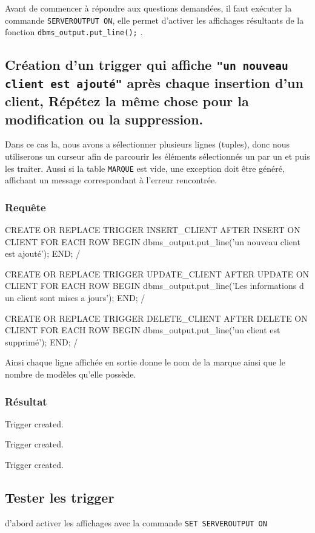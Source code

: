 \documentclass[•]{article}
\begin{document}
\def\reportnumber{5}
\def\reporttitle{TRIGGERS}



Avant de commencer à répondre aux questions demandées, il faut exécuter la commande \texttt{SERVEROUTPUT ON}, elle permet d'activer les affichages résultants de la fonction \texttt{dbms\_output.put\_line();} .

\subsection{Création d'un trigger qui affiche \texttt{"un nouveau client est ajouté"} après chaque insertion d’un client,
Répétez la même chose pour la modification ou la suppression.}
Dans ce cas la, nous avons a sélectionner plusieurs lignes (tuples), donc nous utiliserons un curseur afin de parcourir les éléments sélectionnés un par un et puis les traiter.
Aussi si la table \texttt{MARQUE} est vide, une exception doit être généré, affichant un message correspondant à l'erreur rencontrée.

\subsubsection{Requête}
\begin{sql}
CREATE OR REPLACE TRIGGER INSERT_CLIENT 
AFTER INSERT ON CLIENT 
FOR EACH ROW
BEGIN
	dbms_output.put_line('un nouveau client est ajouté');
END;
/


CREATE OR REPLACE TRIGGER UPDATE_CLIENT 
AFTER UPDATE ON CLIENT 
FOR EACH ROW
BEGIN
	dbms_output.put_line('Les informations d un client sont mises a jours');
END;
/


CREATE OR REPLACE TRIGGER DELETE_CLIENT 
AFTER DELETE ON CLIENT 
FOR EACH ROW
BEGIN
	dbms_output.put_line('un client est supprimé');
END;
/
\end{sql}

Ainsi chaque ligne affichée en sortie donne le nom de la marque ainsi que le nombre de modèles qu'elle possède.
\subsubsection{Résultat}
\begin{sql}
Trigger created.

Trigger created.

Trigger created.
\end{sql}

\subsection{Tester les trigger}
d'abord activer les affichages avec la commande \texttt{SET SERVEROUTPUT ON}
\end{document}
